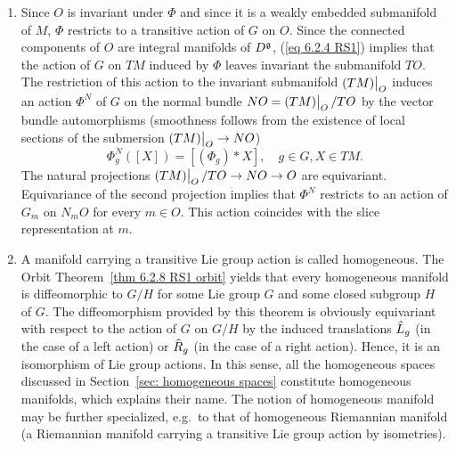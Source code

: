 \begin{rem}[{{\cite[Rem.~6.2.10]{RS1}}}]
\begin{enumerate}
        On the other hand, the isotropy representation restricted to $T_mO$ can be brought to the following normal form. By the Orbit Theorem~\ref{thm 6.2.8 RS1 orbit}, the map $\Phi^m_{\ast e}:\frakg\to T_mM$ has image $T_mO$. By point 3 of Proposition~\ref{prop 6.2.2 RS1} it has kernel $\frakg_m$. Hence, this mapping induces a natural vector space isomorphism
        \[T_mO\cong \frakg\slash\frakg_m.\]
        In view of (\ref{eq 6.2.1 RS1}), this implies that this isomorphism intertwines the representation of $G_m$ on $\frakg\slash\frakg_m$ induced by the adjoint representation with the isotropy representation on $T_mO$.
        \item Since $O$ is invariant under $\Phi$ and since it is a weakly embedded submanifold of $M$, $\Phi$ restricts to a transitive action of $G$ on $O$. Since the connected components of $O$ are integral manifolds of $D^{\mathfrak{g}}$, (\ref{eq 6.2.4 RS1}) implies that the action of $G$ on $TM$ induced by $\Phi$ leaves invariant the submanifold $TO$. The restriction of this action to the invariant submanifold $\restr{(TM)}{O}$ induces an action $\Phi^N$ of $G$ on the normal bundle $NO=\restr{(TM)}{O}\slash TO$ by the vector bundle automorphisms (smoothness follows from the existence of local sections of the submersion $\restr{(TM)}{O}\to NO$)
        \[\Phi_g^N\left([X]\right)=\left[(\Phi_g){\ast}X\right],\quad g\in G,X\in TM.\]
        The natural projections $\restr{(TM)}{O}\slash TO\to NO\to O$ are equivariant. Equivariance of the second projection implies that $\Phi^N$ restricts to an action of $G_m$ on $N_mO$ for every $m\in O$. This action coincides with the slice representation at $m$.
        \item A manifold carrying a transitive Lie group action is called homogeneous. The Orbit Theorem~\ref{thm 6.2.8 RS1 orbit} yields that every homogeneous manifold is diffeomorphic to $G\slash H$ for some Lie group $G$ and some closed subgroup $H$ of $G$. The diffeomorphism provided by this theorem is obviously equivariant with respect to the action of $G$ on $G\slash H$ by the induced translations $\wh{L}_g$ (in the case of a left action) or $\wh{R}_g$ (in the case of a right action). Hence, it is an isomorphism of Lie group actions. In this sense, all the homogeneous spaces discussed in Section~\ref{sec: homogeneous spaces} constitute homogeneous manifolds, which explains their name. The notion of homogeneous manifold may be further specialized, e.g.~to that of homogeneous Riemannian manifold (a Riemannian manifold carrying a transitive Lie group action by isometries).
    \end{enumerate}
\end{rem}




